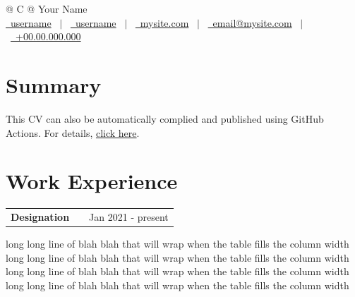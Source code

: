 \documentclass[a4paper,12pt]{article}
\makeatletter
\newenvironment{jobshort}[2]
    {
    \begin{tabularx}{\linewidth}{@{}l X r@{}}
    \textbf{#1} & \hfill &  #2 \\[3.75pt]
    \end{tabularx}
    }
    {
    }
\makeatother
\begin{document}
\pagestyle{empty} 



\begin{tabularx}{\linewidth}{@{} C @{}}
\Huge{Your Name} \\[7.5pt]
\href{https://github.com/username}{\raisebox{-0.05\height}\faGithub\ username} \ $|$ \ 
\href{https://linkedin.com/in/username}{\raisebox{-0.05\height}\faLinkedin\ username} \ $|$ \ 
\href{https://mysite.com}{\raisebox{-0.05\height}\faGlobe \ mysite.com} \ $|$ \ 
\href{mailto:email@mysite.com}{\raisebox{-0.05\height}\faEnvelope \ email@mysite.com} \ $|$ \ 
\href{tel:+000000000000}{\raisebox{-0.05\height}\faMobile \ +00.00.000.000} \\
\end{tabularx}


\section{Summary}
This CV can also be automatically complied and published using GitHub Actions. For details, \href{https://github.com/jitinnair1/autoCV}{click here}.

\section{Work Experience}

\begin{jobshort}{Designation}{Jan 2021 - present}
long long line of blah blah that will wrap when the table fills the column width long long line of blah blah that will wrap when the table fills the column width long long line of blah blah that will wrap when the table fills the column width long long line of blah blah that will wrap when the table fills the column width
\end{jobshort}
\end{document}
